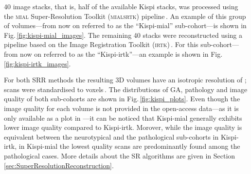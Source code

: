 \num{40} image stacks, that is, half of the available Kispi stacks, was processed using the \textsc{mial} Super-Resolution Toolkit (\textsc{mialsrtk}) pipeline\,\cite{Tourbier2015, MIALSRTK}. An example of this group of volumes---from now on referred to as the \enquote{Kispi-mial} sub-cohort---is shown in Fig.\,\ref{fig:kispi-mial_images}. The remaining \num{40} stacks were reconstructed using a pipeline based on the Image Registration Toolkit (\textsc{irtk})\,\cite{Kuklisova2012, irtk-simple}. For this sub-cohort---from now on referred to as the \enquote{Kispi-irtk}---an example is shown in Fig.\,\ref{fig:kispi-irtk_images}.

For both SRR methods the resulting 3D volumes have an isotropic resolution of ; scans were standardised to  voxels\,\cite{FeTA2021_review}. The distributions of GA, pathology and image quality of both sub-cohorts are shown in Fig.\,\ref{fig:kispi_plots}. Even though the image quality for each volume is not provided in the open-access data---as it is only available as a plot in \cite{FeTA2024_review}---it can be noticed that Kispi-mial generally exhibits lower image quality compared to Kispi-irtk. Morover, while the image quality is equivalent between the neurotypical and the pathological sub-cohorts in Kispi-irtk, in Kispi-mial the lowest quality scans are predominantly found among the pathological cases. More details about the SR algorithms are given in Section \ref{sec:SuperResolutionReconstruction}.

